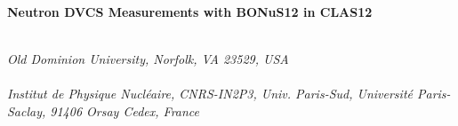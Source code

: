 \begin{titlepage}
     \begin{center}
       \vspace*{-1.8cm}
       \noindent \Huge \textbf{Neutron DVCS Measurements with BONuS12 in 
        CLAS12} \\
     \end{center}
   
\renewcommand{\thefootnote}{\fnsymbol{footnote}}
     \begin{center}


       \vspace*{1.0cm}
         \\
       \vspace*{0.2cm}
       \noindent \emph{Old Dominion University, Norfolk, VA 23529, USA} \\


       \vspace*{1.0cm}
        \\
       \vspace*{0.2cm}
       \noindent \emph{Institut de Physique Nucl\'eaire, CNRS-IN2P3, Univ. Paris-Sud, 
                       Universit\'e Paris-Saclay, 91406 Orsay Cedex, France} \\
       
        
        
        
        
        
        \vspace*{0.7cm}
        \\
      \end{center}
\renewcommand*{\thefootnote}{\arabic{footnote}}

\date{\today}
     

\end{titlepage}
\sloppy

\titlepage
